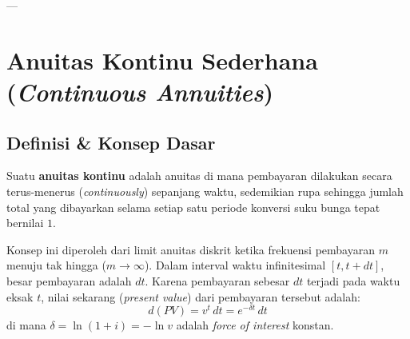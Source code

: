 \documentclass[11pt,a4paper]{article}
\begin{document}
---

\section{Anuitas Kontinu Sederhana (\textit{Continuous Annuities})}

\subsection{Definisi \& Konsep Dasar}

\begin{definitionbox}
Suatu \textbf{anuitas kontinu} adalah anuitas di mana pembayaran dilakukan secara terus-menerus (\textit{continuously}) sepanjang waktu, sedemikian rupa sehingga jumlah total yang dibayarkan selama setiap satu periode konversi suku bunga tepat bernilai $1$.
\end{definitionbox}

Konsep ini diperoleh dari limit anuitas diskrit ketika frekuensi pembayaran $m$ menuju tak hingga ($m \to \infty$). Dalam interval waktu infinitesimal $[t, t+dt]$, besar pembayaran adalah $dt$.
Karena pembayaran sebesar $dt$ terjadi pada waktu eksak $t$, nilai sekarang (\textit{present value}) dari pembayaran tersebut adalah:
\begin{equation}
    d(PV) = v^t \, dt = e^{-\delta t} \, dt
\end{equation}
di mana $\delta = \ln(1+i) = -\ln v$ adalah \textit{force of interest} konstan.

\begin{center}
\end{center}
\end{document}
